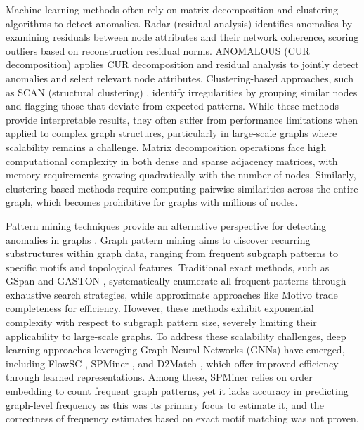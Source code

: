 \documentclass[pdflatex,sn-mathphys-num]{sn-jnl}%
\theoremstyle{thmstyleone}%
\theoremstyle{thmstyletwo}%
\theoremstyle{thmstylethree}%
\begin{document}
Machine learning methods often rely on matrix decomposition and clustering algorithms to detect anomalies. Radar (residual analysis) \cite{li2017radar} identifies anomalies by examining residuals between node attributes and their network coherence, scoring outliers based on reconstruction residual norms. ANOMALOUS (CUR decomposition) \cite{peng2018anomalous} applies CUR decomposition \cite{mahoney2009cur} and residual analysis to jointly detect anomalies and select relevant node attributes. Clustering-based approaches, such as SCAN (structural clustering) \cite{xu2007scan}, identify irregularities by grouping similar nodes and flagging those that deviate from expected patterns. While these methods provide interpretable results, they often suffer from performance limitations when applied to complex graph structures, particularly in large-scale graphs where scalability remains a challenge. Matrix decomposition operations face high computational complexity in both dense and sparse adjacency matrices, with memory requirements growing quadratically with the number of nodes. Similarly, clustering-based methods require computing pairwise similarities across the entire graph, which becomes prohibitive for graphs with millions of nodes.

Pattern mining techniques provide an alternative perspective for detecting anomalies in graphs \cite{potin2023pattern,yuan2024higherorder}. Graph pattern mining aims to discover recurring substructures within graph data, ranging from frequent subgraph patterns to specific motifs and topological features. Traditional exact methods, such as GSpan \cite{yan2002gspan} and GASTON \cite{nijssen2005gaston}, systematically enumerate all frequent patterns through exhaustive search strategies, while approximate approaches like Motivo \cite{bressan2021faster} trade completeness for efficiency. However, these methods exhibit exponential complexity with respect to subgraph pattern size, severely limiting their applicability to large-scale graphs. To address these scalability challenges, deep learning approaches leveraging Graph Neural Networks (GNNs) have emerged, including FlowSC \cite{guo2025efficient}, SPMiner \cite{ying2024representation}, and D2Match \cite{liu2023d2match}, which offer improved efficiency through learned representations. Among these, SPMiner relies on order embedding \cite{mcfee2009partial,vendrov2016orderembeddings} to count frequent graph patterns, yet it lacks accuracy in predicting graph-level frequency as this was its primary focus to estimate it, and the correctness of frequency estimates based on exact motif matching was not proven.
\end{document}
